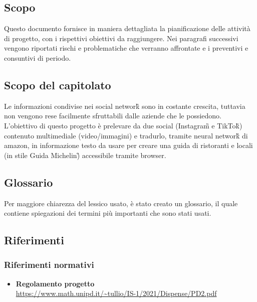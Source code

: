 \subsection{Scopo}
Questo documento fornisce in maniera dettagliata la pianificazione delle attività di progetto, con i rispettivi obiettivi da raggiungere. Nei paragrafi successivi vengono riportati rischi e problematiche che verranno affrontate e i preventivi e consuntivi di periodo.

\subsection{Scopo del capitolato}
Le informazioni condivise nei social network\G{} sono in costante crescita, tuttavia non vengono rese facilmente sfruttabili dalle aziende che le possiedono. L'obiettivo di questo progetto è prelevare da due social (Instagram\G{} e TikTok\G{}) contenuto multimediale (video/immagini) e tradurlo, tramite neural network\G{} di amazon, in informazione testo da usare per creare una guida di ristoranti e locali (in stile Guida Michelin\G) accessibile tramite browser.

\subsection{Glossario}
Per maggiore chiarezza del lessico usato, è stato creato un glossario, il quale contiene spiegazioni dei termini più importanti che sono stati usati.

\subsection{Riferimenti} %
\subsubsection{Riferimenti normativi}
\begin{itemize}
	\item
	{\textbf{Regolamento progetto}}\\\url{https://www.math.unipd.it/~tullio/IS-1/2021/Dispense/PD2.pdf}
	
\end{itemize}
